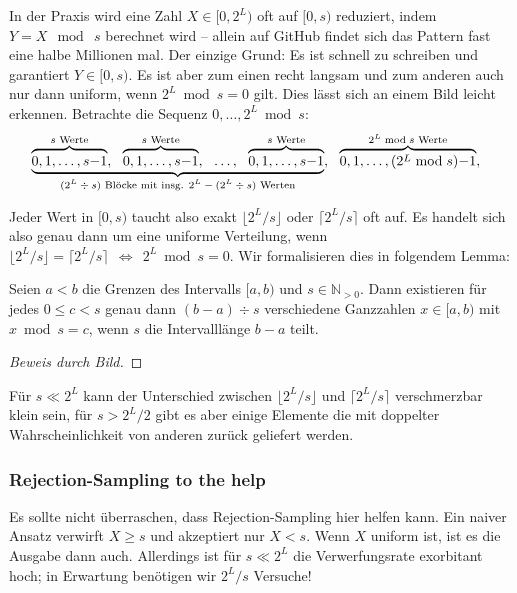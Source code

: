 In der Praxis wird eine Zahl $X \in [0, 2^L)$ oft auf $[0, s)$ reduziert, indem $Y = X~\bmod~s$ berechnet wird
-- allein auf GitHub findet sich das Pattern  fast eine halbe Millionen mal.
Der einzige Grund: Es ist schnell zu schreiben und garantiert $Y \in [0, s)$.
Es ist aber zum einen recht langsam und zum anderen auch nur dann uniform, wenn $2^L \bmod s = 0$ gilt.
Dies lässt sich an einem Bild leicht erkennen.
Betrachte die Sequenz $0, \ldots, 2^L \bmod s$:
\begin{equation}
    \underbrace{
        \overbrace{0, 1, \ldots, s{-}1 \vphantom{\cramped{2^L}}}^{\text{$s$ Werte}},\ \
        \overbrace{0, 1, \ldots, s{-}1 \vphantom{\cramped{2^L}}}^{\text{$s$ Werte}},\ \
        \ldots, \ \
        \overbrace{0, 1, \ldots, s{-}1 \vphantom{\cramped{2^L}}}^{\text{$s$ Werte}}
    }_{\text{$(2^L \div s)$ Blöcke mit insg. $2^L - (2^L \div s)$ Werten}},\ \
    \overbrace{0, 1, \ldots, (\cramped{2^L} \bmod s){-}1}^{\text{$2^L \bmod s$ Werte}},\ \
    \label{eq:s_bloecke_in_2l}
\end{equation}

Jeder Wert in $[0, s)$ taucht also exakt $\lfloor 2^L / s \rfloor$ oder $\lceil 2^L /s \rceil$ oft auf.
Es handelt sich also genau dann um eine uniforme Verteilung, wenn $\lfloor 2^L / s \rfloor = \lceil 2^L /s \rceil\ \ \Leftrightarrow\ \ 2^L \bmod s = 0$.
Wir formalisieren dies in folgendem Lemma:

\begin{lemma}\label{lem:gleichverteilt_in_ab}
    Seien $a < b$ die Grenzen des Intervalls $[a, b)$ und $s \in \mathbb N_{>0}$.
    Dann existieren für jedes $0 \le c < s$ genau dann $(b - a) \div s$ verschiedene Ganzzahlen $x \in [a, b)$ mit $x \bmod s = c$, wenn $s$ die Intervalllänge $b-a$ teilt.
\end{lemma}
\begin{proof}[Beweis durch Bild]
\end{proof}

Für $s \ll 2^L$ kann der Unterschied zwischen $\lfloor 2^L /s \rfloor$ und $\lceil 2^L / s \rceil$ verschmerzbar klein sein, für $s > 2^L / 2$ gibt es aber einige Elemente die mit doppelter Wahrscheinlichkeit von anderen zurück geliefert werden.

\subsubsection{Rejection-Sampling to the help}
Es sollte nicht überraschen, dass Rejection-Sampling hier helfen kann.
Ein naiver Ansatz verwirft $X \ge s$ und akzeptiert nur $X < s$.
Wenn $X$ uniform ist, ist es die Ausgabe dann auch.
Allerdings ist für $s \ll 2^L$ die Verwerfungsrate exorbitant hoch;
in Erwartung benötigen wir $2^L / s$ Versuche!


